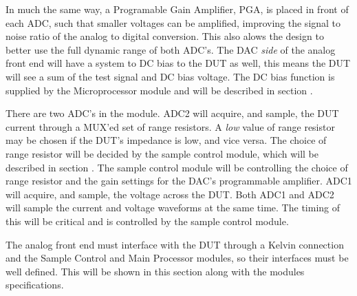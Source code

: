 In much the same way, a Programable Gain Amplifier, PGA, is placed in front of each ADC, such that smaller voltages can be amplified, improving the signal to noise ratio of the analog to digital conversion. This also alows the design to better use the full dynamic range of both ADC's. The DAC \textit{side} of the analog front end will have a system to DC bias to the DUT as well, this means the DUT will see a sum of the test signal and DC bias voltage. The DC bias function is supplied by the Microprocessor module and will be described in section .

There are two ADC's in the module. ADC2 will acquire, and sample, the DUT current through a MUX'ed set of range resistors. A \textit{low} value of range resistor may be chosen if the DUT's impedance is low, and vice versa. The choice of range resistor will be decided by the sample control module, which will be described in section . The sample control module will be controlling the choice of range resistor and the gain settings for the DAC's programmable amplifier. ADC1 will acquire, and sample, the voltage across the DUT. Both ADC1 and ADC2 will sample the current and voltage waveforms at the same time. The timing of this will be critical and is controlled by the sample control module.

The analog front end must interface with the DUT through a Kelvin connection and the Sample Control and Main Processor modules, so their interfaces must be well defined. This will be shown in this section along with the modules specifications.

